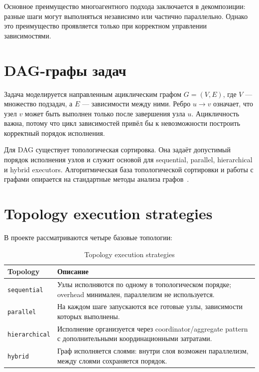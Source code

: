 \documentclass[12pt,a4paper]{report}
\newcommand{\code}[1]{\texttt{#1}}
\begin{document}
Основное преимущество многоагентного подхода заключается в декомпозиции: разные шаги могут выполняться независимо или частично параллельно. Однако это преимущество проявляется только при корректном управлении зависимостями.

\section{DAG-графы задач}

Задача моделируется направленным ациклическим графом \(G=(V,E)\), где \(V\) --- множество подзадач, а \(E\) --- зависимости между ними. Ребро \(u \rightarrow v\) означает, что узел \(v\) может быть выполнен только после завершения узла \(u\). Ацикличность важна, потому что цикл зависимостей привёл бы к невозможности построить корректный порядок исполнения.

Для DAG существует топологическая сортировка. Она задаёт допустимый порядок исполнения узлов и служит основой для sequential, parallel, hierarchical и hybrid executors. Алгоритмическая база топологической сортировки и работы с графами опирается на стандартные методы анализа графов~\cite{kahn1962topological,cormen2009algorithms}.

\section{Topology execution strategies}

В проекте рассматриваются четыре базовые топологии:

\begin{table}[h]
\centering
\caption{Topology execution strategies}
\begin{tabular}{p{}p{}}
\toprule
Topology & Описание \\
\midrule
\code{sequential} & Узлы исполняются по одному в топологическом порядке; overhead минимален, параллелизм не используется. \\
\code{parallel} & На каждом шаге запускаются все готовые узлы, зависимости которых выполнены. \\
\code{hierarchical} & Исполнение организуется через coordinator/aggregate pattern с дополнительными координационными затратами. \\
\code{hybrid} & Граф исполняется слоями: внутри слоя возможен параллелизм, между слоями сохраняется порядок. \\
\bottomrule
\end{tabular}
\end{table}
\end{document}
